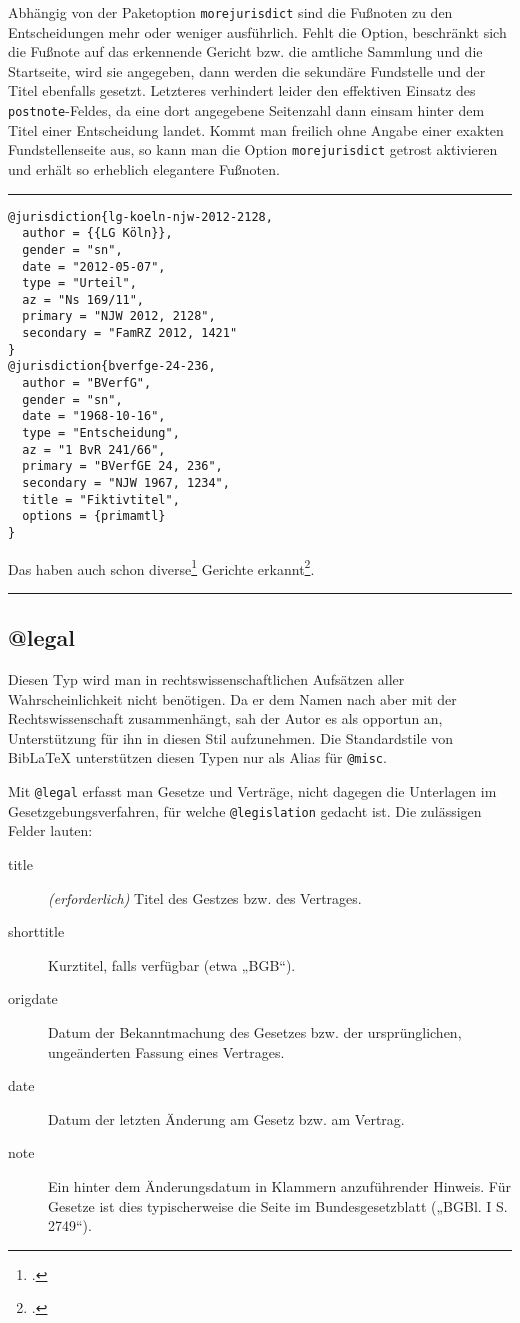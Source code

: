 \documentclass[11pt,a4paper,DIV=calc,draft]{scrartcl}
\newcommand\software[1]{\textsf{#1}}
\newcommand\Biblatex{\software{Bib\LaTeX{}}\xspace}
\newenvironment{rubexample}{\par\vspace{\baselineskip}\hrule\par\begin{refsection}}{\end{refsection}\par\hrule\par\vspace{\baselineskip}}
\begin{document}
Abhängig von der Paketoption \verb+morejurisdict+ sind die Fußnoten zu
den Entscheidungen mehr oder weniger ausführlich. Fehlt die Option,
beschränkt sich die Fußnote auf das erkennende Gericht bzw. die
amtliche Sammlung und die Startseite, wird sie angegeben, dann werden
die sekundäre Fundstelle und der Titel ebenfalls gesetzt. Letzteres
verhindert leider den effektiven Einsatz des \verb+postnote+-Feldes,
da eine dort angegebene Seitenzahl dann einsam hinter dem Titel einer
Entscheidung landet. Kommt man freilich ohne Angabe einer exakten
Fundstellenseite aus, so kann man die Option \verb+morejurisdict+
getrost aktivieren und erhält so erheblich elegantere Fußnoten.

\begin{rubexample}
\begin{verbatim}
@jurisdiction{lg-koeln-njw-2012-2128,
  author = {{LG Köln}},
  gender = "sn",
  date = "2012-05-07",
  type = "Urteil",
  az = "Ns 169/11",
  primary = "NJW 2012, 2128",
  secondary = "FamRZ 2012, 1421"
}
@jurisdiction{bverfge-24-236,
  author = "BVerfG",
  gender = "sn",
  date = "1968-10-16",
  type = "Entscheidung",
  az = "1 BvR 241/66",
  primary = "BVerfGE 24, 236",
  secondary = "NJW 1967, 1234",
  title = "Fiktivtitel",
  options = {primamtl}
}
\end{verbatim}

Das haben auch schon diverse\footcite[2129]{lg-koeln-njw-2012-2128}
Gerichte erkannt\footcite{bverfge-24-236}.

\printbibliography
\end{rubexample}

\subsection{@legal}

Diesen Typ wird man in rechtswissenschaftlichen Aufsätzen aller
Wahrscheinlichkeit nicht benötigen. Da er dem Namen nach aber mit der
Rechtswissenschaft zusammenhängt, sah der Autor es als opportun an,
Unterstützung für ihn in diesen Stil aufzunehmen. Die Standardstile
von \Biblatex unterstützen diesen Typen nur als Alias für \verb+@misc+.

Mit \verb+@legal+ erfasst man Gesetze und Verträge, nicht dagegen die
Unterlagen im Gesetzgebungsverfahren, für welche \verb+@legislation+
gedacht ist. Die zulässigen Felder lauten:

\begin{description}
\item[title] \emph{(erforderlich)} Titel des Gestzes bzw. des
  Vertrages.
\item[shorttitle] Kurztitel, falls verfügbar (etwa „BGB“).
\item[origdate] Datum der Bekanntmachung des Gesetzes bzw. der
  ursprünglichen, ungeänderten Fassung eines Vertrages.
\item[date] Datum der letzten Änderung am Gesetz bzw. am Vertrag.
\item[note] Ein hinter dem Änderungsdatum in Klammern anzuführender
  Hinweis. Für Gesetze ist dies typischerweise die Seite im
  Bundesgesetzblatt („BGBl. I S. 2749“).
\end{description}
\end{document}
